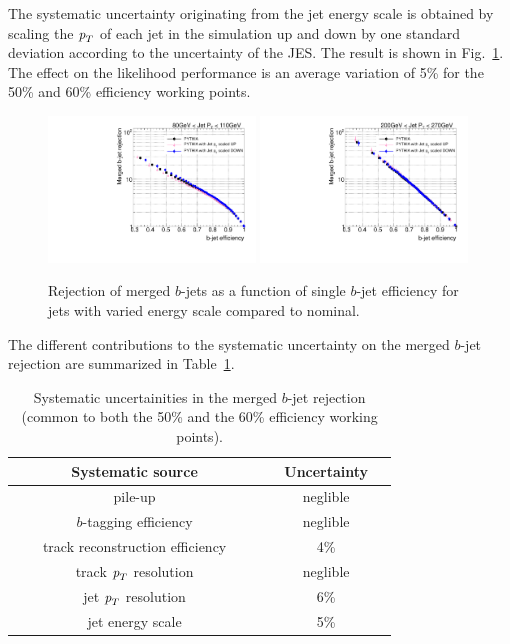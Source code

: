 The systematic uncertainty originating from the jet energy scale is obtained by scaling the ${\emph{p}_{T}}$ of each jet in the simulation up and down by one standard deviation according to the uncertainty of the JES.  The result is shown in Fig.~\ref{fig:jesuncertainty}. The effect on the likelihood performance is an average variation of 5\% for the 50\% and 60\% efficiency working points. 


\begin{figure}[tp]
\centering
\includegraphics[width=0.49\textwidth]{FIGS/systematics/LlhoodKDE_ISO_JESUncertaintyTest_rejvseff080.pdf}
\includegraphics[width=0.49\textwidth]{FIGS/systematics/LlhoodKDE_ISO_JESUncertaintyTest_rejvseff200.pdf}
\caption{Rejection of merged $b$-jets as a function of single $b$-jet efficiency for jets with varied energy scale compared to nominal.}
\label{fig:jesuncertainty}
\end{figure}


\vspace{3mm}
The different contributions to the systematic uncertainty on the merged $b$-jet rejection are summarized in Table~\ref{tb:systematics}.
\begin{table}[!hbt] %
\renewcommand{\arraystretch}{1.2}
\centering
\begin{tabular}{ | c | c |}
\hline
  ~~~~~~~Systematic source~~~~~~~ &~~Uncertainty~~\\ \hline
  pile-up          &  neglible     \\ 
  $b$-tagging efficiency     &  neglible     \\ 
  track reconstruction efficiency  &    4\%        \\ 
  track ${\emph{p}_{T}}$ resolution &  neglible     \\
  jet ${\emph{p}_{T}}$ resolution  &    6\%        \\  
  jet energy scale  &    5\%        \\ \hline 
\end{tabular}
\caption{Systematic uncertainities in the merged $b$-jet rejection (common to both the 50\% and the 60\% efficiency working points).}
\label{tb:systematics}
\end{table}

